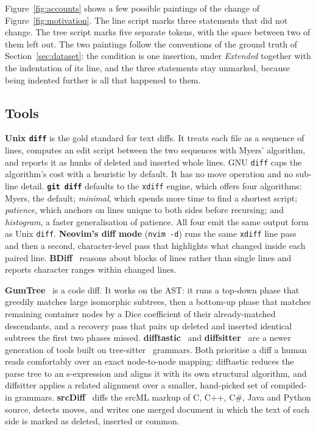 \documentclass[sigconf,review]{acmart}
\begin{document}
Figure~\ref{fig:accounts} shows a few possible paintings of the change of Figure~\ref{fig:motivation}.
The line script marks three statements that did not change. The tree script marks five separate tokens, with the space between two of them left
out. The two paintings follow the conventions of the ground truth of Section~\ref{sec:dataset}: the
condition is one insertion, under \emph{Extended} together with the indentation of its line, and the
three statements stay unmarked, because being indented further is all that happened to them.

\subsection{Tools}
\label{sec:background-tools}

\textbf{Unix \texttt{diff}} is the gold standard for text diffs. It treats each file as a
sequence of lines, computes an edit script between the two sequences with Myers' algorithm, and
reports it as hunks of deleted and inserted whole lines. GNU \texttt{diff} caps the algorithm's
cost with a heuristic by default. It has no move operation and no sub-line detail.
\textbf{\texttt{git diff}} defaults to the \texttt{xdiff} engine, which offers four algorithms:
Myers, the default; \emph{minimal}, which spends more time to find a shortest script;
\emph{patience}, which anchors on lines unique to both sides before recursing; and
\emph{histogram}, a faster generalisation of patience. All four emit the same output form as Unix
\texttt{diff}. \textbf{Neovim's diff mode} (\texttt{nvim -d}) runs the same \texttt{xdiff} line
pass and then a second, character-level pass that highlights what changed inside each paired
line. \textbf{BDiff}~\cite{bdiff} reasons about blocks of lines rather than single lines and
reports character ranges within changed lines.

\textbf{GumTree}~\cite{gumtreediff-2014} is a code diff. It works on the AST: it runs a top-down phase that greedily matches large isomorphic
subtrees, then a bottom-up phase that matches remaining container nodes by a Dice coefficient of
their already-matched descendants, and a recovery pass that pairs up deleted and inserted
identical subtrees the first two phases missed. \textbf{difftastic}~\cite{difftastic} and
\textbf{diffsitter}~\cite{diffsitter} are a newer generation of tools built on
tree-sitter~\cite{tree-sitter} grammars. Both prioritise a diff a human reads comfortably over an
exact node-to-node mapping: difftastic reduces the parse tree to an s-expression and aligns it
with its own structural algorithm, and diffsitter applies a related alignment over a smaller,
hand-picked set of compiled-in grammars. \textbf{srcDiff}~\cite{decker-2020} diffs the srcML
markup of C, C++, C\#, Java and Python source, detects moves, and writes one merged document in
which the text of each side is marked as deleted, inserted or common.
\end{document}
